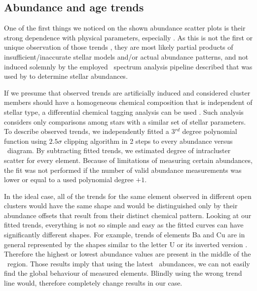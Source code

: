 \subsection{Abundance and age trends}
\label{sec:abund_trends}
One of the first things we noticed on the shown abundance scatter plots is their strong dependence with physical parameters, especially \Teff. As this is not the first or unique observation of those trends \cite{2010A&A...523A..71G, 2013ApJ...775...58B, 2016MNRAS.457.3934L, 2018A&A...619A.176B, 2019arXiv191208539C}, they are most likely partial products of insufficient/inaccurate stellar models and/or actual abundance patterns, and not induced solemnly by the employed \SME\ spectrum analysis pipeline described that was used by \citet{buder2020} to determine stellar abundances.

If we presume that observed trends are artificially induced and considered cluster members should have a homogeneous chemical composition that is independent of stellar type, a differential chemical tagging analysis can be used \cite{2019arXiv191208539C}. Such analysis considers only comparisons among stars with a similar set of stellar parameters. To describe observed trends, we independently fitted a 3$^{rd}$ degree polynomial function using $2.5\sigma$ clipping algorithm in 2 steps to every abundance versus \Teff\ diagram. By subtracting fitted trends, we estimated degree of intracluster scatter for every element. Because of limitations of measuring certain abundances, the fit was not performed if the number of valid abundance measurements was lower or equal to a used polynomial degree $+1$.

In the ideal case, all of the trends for the same element observed in different open clusters would have the same shape and would be distinguished only by their abundance offsets that result from their distinct chemical pattern. Looking at our fitted trends, everything is not so simple and easy as the fitted curves can have significantly different shapes. For example, trends of elements Ba and Cu are in general represented by the shapes similar to the letter U or its inverted version \rotU. Therefore the highest or lowest abundance values are present in the middle of the \Teff\ region. Those results imply that using the latest \Gh\ abundances, we can not easily find the global behaviour of measured elements. Blindly using the wrong trend line would, therefore completely change results in our case.

